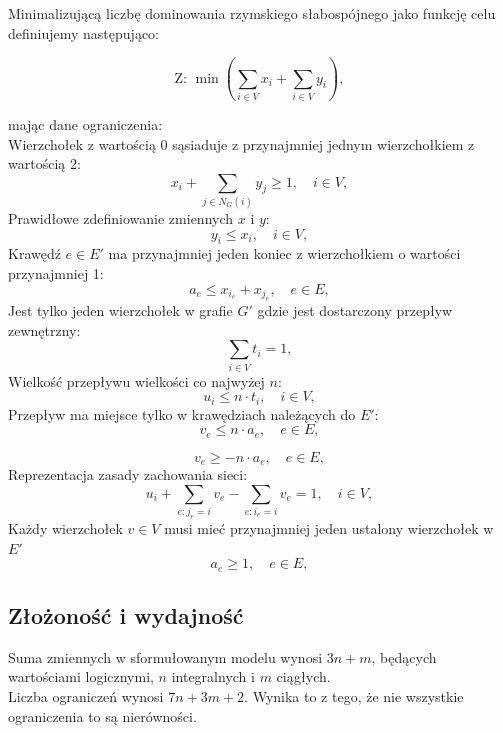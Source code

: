 Minimalizującą liczbę dominowania rzymskiego słabospójnego jako funkcję celu definiujemy następująco:

\[
\text{Z: } \min \left( \sum_{i \in V} x_i + \sum_{i \in V} y_i \right),
\]

mając dane ograniczenia:\\
Wierzchołek z wartością 0 sąsiaduje z przynajmniej jednym wierzchołkiem z wartością 2:
\[
x_i + \sum_{j \in N_G(i)} y_j \geq 1, \quad i \in V, \tag{1}
\]
Prawidłowe zdefiniowanie zmiennych $x$ i $y$:
\[
y_i \leq x_i, \quad i \in V, \tag{2}
\]
Krawędź $e \in E'$ ma przynajmniej jeden koniec z wierzchołkiem o wartości przynajmniej 1:
\[
a_e \leq x_{i_e} + x_{j_e}, \quad e \in E, \tag{3}
\]
Jest tylko jeden wierzchołek w grafie $G'$ gdzie jest dostarczony przepływ zewnętrzny:
\[
\sum_{i \in V} t_i = 1, \tag{4}
\]
Wielkość przepływu wielkości co najwyżej $n$:
\[
u_i \leq n \cdot t_i, \quad i \in V, \tag{5}
\]
Przepływ ma miejsce tylko w krawędziach należących do $E'$:
\[
v_e \leq n \cdot a_e, \quad e \in E, \tag{6}
\]

\[
v_e \geq -n \cdot a_e, \quad e \in E, \tag{7}
\]
Reprezentacja zasady zachowania sieci:
\[
u_i + \sum_{e: j_e = i} v_e - \sum_{e: i_e = i} v_e = 1, \quad i \in V, \tag{8}
\]
Każdy wierzchołek $v \in V$ musi mieć przynajmniej jeden ustalony wierzchołek w $E'$
\[
a_e \geq 1, \quad e \in E, \tag{9}
\]

\subsection{Złożoność i wydajność}

Suma zmiennych w sformułowanym modelu wynosi $3n + m$, będących wartościami logicznymi, $n$ integralnych i $m$ ciągłych.\\
Liczba ograniczeń wynosi $7n+3m+2$. Wynika to z tego, że nie wszystkie ograniczenia to są nierówności.

